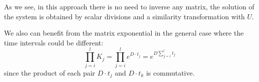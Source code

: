 As we see, in this approach there is no need to inverse any matrix, the solution of the system is obtained by scalar divisions and a similarity transformation with $U$.

We also can benefit from the matrix exponential in the general case where the time intervals could be different:
\[
  \prod_{j = i}^l K_j = \prod_{j = i}^l e^{D \cdot t_j} = e^{D \sum_{j = i}^l t_j}
\]
since the product of each pair $D \cdot t_j$ and $D \cdot t_k$ is commutative.
